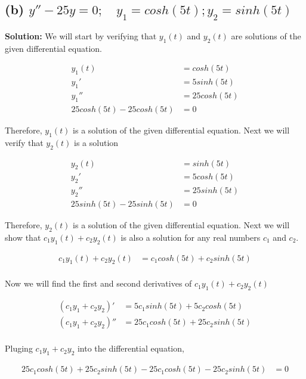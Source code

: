 \documentclass[12pt, letterpaper]{article}
\begin{document}
\subsection*{(b) $y'' - 25y = 0; \quad y_1 = cosh(5t); y_2 = sinh(5t)$}

\textbf{Solution:} We will start by verifying that $y_1(t)$ and $y_2(t)$ are solutions of the given differential equation.

\begin{align*}
    y_1(t) &= cosh(5t) \\
    y_1' &= 5sinh(5t) \\
    y_1'' &= 25cosh(5t) \\
    25cosh(5t) - 25cosh(5t) &= 0
\end{align*}

Therefore, $y_1(t)$ is a solution of the given differential equation. Next we will verify that $y_2(t)$ is a solution

\begin{align*}
    y_2(t) &= sinh(5t) \\
    y_2' &= 5cosh(5t) \\
    y_2'' &= 25sinh(5t) \\
    25sinh(5t) - 25sinh(5t) &= 0
\end{align*}

Therefore, $y_2(t)$ is a solution of the given differential equation. Next we will show that $c_1y_1(t) + c_2y_2(t)$ is also a solution for any real numbers $c_1$ and $c_2$.

\begin{align*}
    c_1y_1(t) + c_2y_2(t) &= c_1cosh(5t) + c_2sinh(5t) \\
\end{align*}

Now we will find the first and second derivatives of $c_1y_1(t) + c_2y_2(t)$

\begin{align*}
    (c_1y_1 + c_2y_2)' &= 5c_1sinh(5t) + 5c_2cosh(5t) \\
    (c_1y_1 + c_2y_2)'' &= 25c_1cosh(5t) + 25c_2sinh(5t) \\
\end{align*}

Pluging $c_1y_1 + c_2y_2$ into the differential equation,

\begin{align*}
    25c_1cosh(5t) + 25c_2sinh(5t) - 25c_1cosh(5t) - 25c_2sinh(5t) &= 0
\end{align*}
\end{document}

